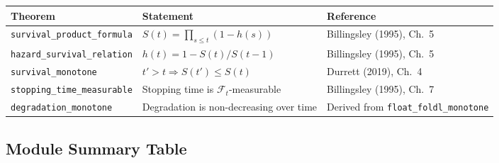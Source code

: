 \begin{center}
\begin{tabular}{lll}
\toprule
Theorem & Statement & Reference \\
\midrule
\texttt{survival\_product\_formula} & $S(t) = \prod_{s \leq t}(1 - h(s))$ & Billingsley (1995), Ch.~5 \\
\texttt{hazard\_survival\_relation} & $h(t) = 1 - S(t)/S(t-1)$ & Billingsley (1995), Ch.~5 \\
\texttt{survival\_monotone} & $t' > t \Rightarrow S(t') \leq S(t)$ & Durrett (2019), Ch.~4 \\
\texttt{stopping\_time\_measurable} & Stopping time is $\mathcal{F}_t$-measurable & Billingsley (1995), Ch.~7 \\
\texttt{degradation\_monotone} & Degradation is non-decreasing over time & Derived from \texttt{float\_foldl\_monotone} \\
\bottomrule
\end{tabular}
\end{center}

\subsection{Module Summary Table}


